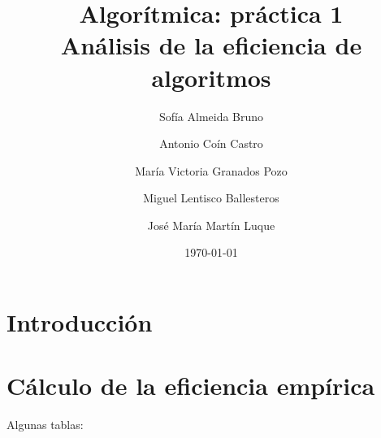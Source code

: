 \documentclass[11pt]{article}
\title{Algorítmica: práctica 1 \\ \large Análisis de la eficiencia de algoritmos}
\author{Sofía Almeida Bruno \and Antonio Coín Castro \and María Victoria Granados Pozo \and Miguel Lentisco Ballesteros \and José María Martín Luque}
\date{\today}
\begin{document}
\maketitle

\newpage

\section*{Introducción}

\lipsum


\section*{Cálculo de la eficiencia empírica}


\begin{center}
	
\end{center}



\begin{center}
	
\end{center}



\begin{center}
	
\end{center}



\begin{center}
	
\end{center}



\begin{center}
	
\end{center}



\begin{center}
	
\end{center}



\begin{center}
	
\end{center}


\begin{center}
	
\end{center}

\newpage

Algunas tablas:
\end{document}
